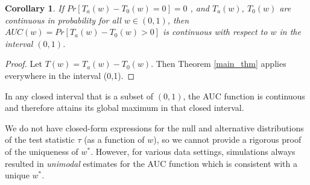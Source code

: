 \documentclass[12pt]{article} %
\newtheorem{cor}{Corollary}
\begin{document}
\begin{cor}{
 If $Pr[T_a(w)-T_0(w)=0]=0$ , and $T_a(w)$, $T_0(w)$ are continuous in probability for all $w \in (0,1)$, then $AUC(w)=Pr\left[T_a(w)-T_0(w) >0 \right]$ is continuous with respect to $w$  in the interval $(0,1)$.}
\end{cor}
\begin{proof}

Let $T(w)=T_a(w)-T_0(w).$ Then Theorem \ref{main_thm} applies everywhere in the interval (0,1).
\end{proof}

In any closed interval that is a subset of $(0,1)$, the AUC function is continuous and therefore attains its global maximum in that closed interval.

 We do not have closed-form expressions for the null and alternative distributions of the test statistic $\tau$ (as a function of  $w$), so we cannot provide a rigorous proof of the uniqueness of $w^*$. However, for various data settings, simulations always resulted in \emph{unimodal}  estimates for the AUC function which is  consistent with a unique $w^*$.
\end{document}
